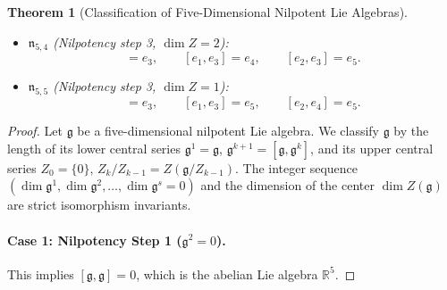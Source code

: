 \documentclass[11pt,a4paper]{article}
\newtheorem{theorem}{Theorem}[section]
\theoremstyle{definition}
\theoremstyle{remark}
\newcommand{\R}{\mathbb{R}}
\newcommand{\g}{\mathfrak{g}}
\begin{document}
\begin{theorem}[Classification of Five-Dimensional Nilpotent Lie Algebras]
\begin{enumerate}
\begin{itemize}
        \item $\mathfrak{n}_{5,4}$ (Nilpotency step 3, $\dim Z = 2$):
        \begin{equation}
            [e_1, e_2] = e_3, \qquad [e_1, e_3] = e_4, \qquad [e_2, e_3] = e_5.
        \end{equation}
        \item $\mathfrak{n}_{5,5}$ (Nilpotency step 3, $\dim Z = 1$):
        \begin{equation}
            [e_1, e_2] = e_3, \qquad [e_1, e_3] = e_5, \qquad [e_2, e_4] = e_5.
        \end{equation}
    \end{itemize}
\end{enumerate}
\end{theorem}

\begin{proof}
Let $\g$ be a five-dimensional nilpotent Lie algebra. We classify $\g$ by the length of its lower central series $\g^1 = \g$, $\g^{k+1} = [\g, \g^k]$, and its upper central series $Z_0 = \{0\}$, $Z_k/Z_{k-1} = Z(\g/Z_{k-1})$. The integer sequence $(\dim \g^1, \dim \g^2, \dots, \dim \g^s = 0)$ and the dimension of the center $\dim Z(\g)$ are strict isomorphism invariants.

\paragraph{Case 1: Nilpotency Step 1 ($\g^2 = 0$).}
This implies $[\g, \g] = 0$, which is the abelian Lie algebra $\R^5$.


\end{proof}
\end{document}
